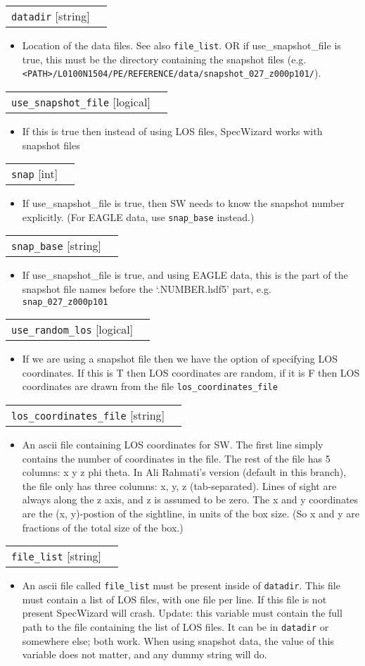 \documentclass{report}
\makeatletter
\newcommand{\paramdefinition}[3]{
\begin{tabular*}{\textwidth}{l@{\extracolsep{\fill}}r}
		{\tt #1} [{\sc #2}]& #3 \\
\end{tabular*}}
\newcommand{\paramdescription}[1]{
\begin{itemize}
\item #1
\end{itemize}\vspace{0.2cm}}
\newcommand{\param}[1]{{\tt #1}}
\makeatother
\begin{document}
\paramdefinition{datadir}{string}{}
\paramdescription{Location of the data files.  See also \param{file\_list}.
OR if use\_snapshot\_file is true, this must be the directory containing the snapshot files (e.g. \param{<PATH>/L0100N1504/PE/REFERENCE/data/snapshot\_027\_z000p101/}).}

\paramdefinition{use\_snapshot\_file}{logical}{}
\paramdescription{If this is true then instead of using LOS files, SpecWizard works with snapshot files}

\paramdefinition{snap}{int}{}
\paramdescription{If use\_snapshot\_file is true, then SW needs to know the snapshot number explicitly. (For EAGLE data, use \param{snap\_base} instead.)}

\paramdefinition{snap\_base}{string}{}
\paramdescription{If use\_snapshot\_file is true, and using EAGLE data, this is the part of the snapshot file names before the `.NUMBER.hdf5' part, e.g. \param{snap\_027\_z000p101}}

\paramdefinition{use\_random\_los}{logical}{}
\paramdescription{If we are using a snapshot file then we have the option of specifying LOS coordinates.  If this is T then LOS coordinates are random, if it is F then LOS coordinates are drawn from the file {\tt los\_coordinates\_file}}

\paramdefinition{los\_coordinates\_file}{string}{}
\paramdescription{An ascii file containing LOS coordinates for SW. The first line simply contains the number of coordinates in the file. The rest of the file has 5 columns: x y z phi theta. In Ali Rahmati's version (default in this branch), the file only has three columns: x, y, z (tab-separated). Lines of sight are always along the z axis, and z is assumed to be zero. The x and y coordinates are the (x, y)-postion of the sightline, in units of the box size. (So x and y are fractions of the total size of the box.)}

\paramdefinition{file\_list}{string}{}
\paramdescription{An ascii file called {\tt file\_list} must be present inside of {\tt datadir}.  This file must contain a list of LOS files, with one file per line.  If this file is not present SpecWizard will crash. Update: this variable must contain the full path to the file containing the list of LOS files. It can be in \param{datadir} or somewhere else; both work. When using snapshot data, the value of this variable does not matter, and any dummy string will do.}
\end{document}
